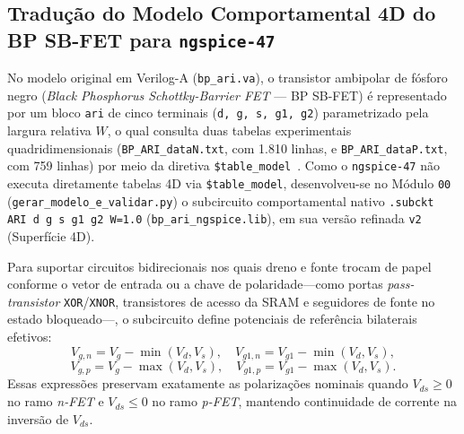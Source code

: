 \subsection{Tradu\c{c}\~{a}o do Modelo Comportamental 4D do BP SB-FET para \texttt{ngspice-47}}\label{sec:met_modelo}

No modelo original em Verilog-A (\texttt{bp\_ari.va}), o transistor ambipolar de f\'{o}sforo negro (\textit{Black Phosphorus Schottky-Barrier FET} --- BP SB-FET) \'{e} representado por um bloco \texttt{ari} de cinco terminais (\texttt{d, g, s, g1, g2}) parametrizado pela largura relativa $W$, o qual consulta duas tabelas experimentais quadridimensionais (\texttt{BP\_ARI\_\allowbreak dataN.txt}, com 1.810 linhas, e \texttt{BP\_ARI\_\allowbreak dataP.txt}, com 759 linhas) por meio da diretiva \texttt{\$table\_model}~\cite{wu2020reconfigurable}. Como o \texttt{ngspice-47} n\~{a}o executa diretamente tabelas 4D via \texttt{\$table\_model}, desenvolveu-se no M\'{o}dulo \texttt{00} (\texttt{gerar\_\allowbreak modelo\_\allowbreak e\_\allowbreak validar.py}) o subcircuito comportamental nativo \texttt{.subckt ARI d g s g1 g2 W=1.0} (\texttt{bp\_ari\_\allowbreak ngspice.lib}), em sua vers\~{a}o refinada \texttt{v2} (Superf\'{i}cie 4D).

Para suportar circuitos bidirecionais nos quais dreno e fonte trocam de papel conforme o vetor de entrada ou a chave de polaridade---como portas \textit{pass-transistor} \texttt{XOR}/\texttt{XNOR}, transistores de acesso da SRAM e seguidores de fonte no estado bloqueado---, o subcircuito define potenciais de refer\^{e}ncia bilaterais efetivos:
\begin{equation}\label{eq:bilateral_ref}
V_{g,n} = V_g - \min(V_d, V_s), \quad V_{g1,n} = V_{g1} - \min(V_d, V_s),
\end{equation}
\begin{equation}\label{eq:bilateral_ref_p}
V_{g,p} = V_g - \max(V_d, V_s), \quad V_{g1,p} = V_{g1} - \max(V_d, V_s).
\end{equation}
Essas express\~{o}es preservam exatamente as polariza\c{c}\~{o}es nominais quando $V_{ds} \ge 0$ no ramo \textit{n-FET} e $V_{ds} \le 0$ no ramo \textit{p-FET}, mantendo continuidade de corrente na invers\~{a}o de $V_{ds}$.

